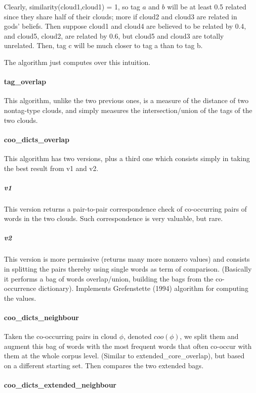 \documentclass[11pt]{article}
\begin{document}
Clearly, similarity(cloud1,cloud1) = 1, so tag $a$ and $b$ will be at least 0.5 related since they share half of their clouds; more if cloud2 and cloud3 are related in gods' beliefs.
Then suppose cloud1 and cloud4 are believed to be related by 0.4, and cloud5, cloud2, are related by 0.6, but cloud5 and cloud3 are totally unrelated.
Then, tag c will be much closer to tag a than to tag b.

The algorithm just computes over this intuition.

\paragraph{tag\_overlap}
This algorithm, unlike the two previous ones, is a measure of the distance of two nontag-type clouds, and simply measures the intersection/union of the tags of the two clouds.


\paragraph{coo\_dicts\_overlap}

This algorithm has two versions, plus a third one which consists simply in taking the best result from v1 and v2.

\subparagraph{v1} This version returns a pair-to-pair correspondence check of co-occur\-ring pairs of words in the two clouds. Such correspondence is very valuable, but rare.

\subparagraph{v2} This version is more permissive (returns many more nonzero values) and consists in splitting the pairs thereby using single words as term of comparison. (Basically it performs a bag of words overlap/union, building the bags from the co-occurrence dictionary). Implements Grefenstette (1994) algorithm for computing the values.

\paragraph{coo\_dicts\_neighbour}

Taken the co-occurring pairs in cloud $\phi$, denoted $coo(\phi)$, we split them and augment this bag of words with the most frequent words that often co-occur with them at the whole corpus level. (Similar to extended\_core\_overlap), but based on a different starting set. Then compares the two extended bags.

\paragraph{coo\_dicts\_extended\_neighbour}
\end{document}
